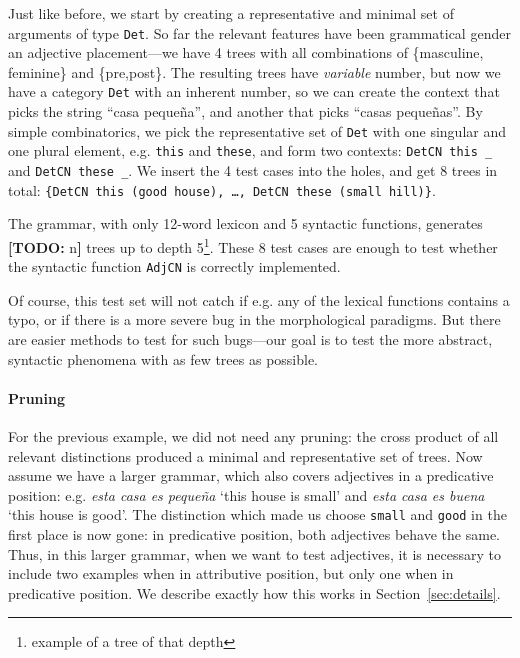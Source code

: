 \documentclass[11pt]{article}
\def\t#1{\texttt{#1}}
\newcommand{\todo}[1]{{\color{cyan}\textbf{[TODO: }#1\textbf{]}}}
\begin{document}
Just like before, we start by creating a representative and minimal
set of arguments of type \t{Det}. So far the relevant features have
been grammatical gender an adjective placement---we have 4 trees with
all combinations of \{masculine, feminine\} and \{pre,post\}. The
resulting trees have \emph{variable} number, but now we have a
category \t{Det} with an inherent number, so we can create the context
that picks the string ``casa  peque\~{n}a'', and another that picks
``casas  peque\~{n}as''. By simple combinatorics, we pick the
representative set of \t{Det} with one singular and one plural
element, e.g. \t{this} and \t{these}, and form two contexts:
\verb|DetCN this _| and  \verb|DetCN these _|. We insert the 4 test
cases into the holes, and get 8 trees in total: \t{\{DetCN this (good
  house), \dots, DetCN these (small hill)\}}. 


The grammar, with only 12-word lexicon and 5 syntactic functions,
generates \todo{n} trees up to depth 5\footnote{example of a tree of that depth}. 
These 8 test cases are enough to test whether the
syntactic function \t{AdjCN} is correctly implemented.   

Of course, this test set will not catch if e.g. any of the lexical
functions contains a typo, or if there is a more severe bug in the
morphological paradigms. But there are easier methods to test for such
bugs---our goal is to test the more abstract, syntactic phenomena with
as few trees as possible. 


\paragraph{Pruning}

For the previous example, we did not need any pruning: the cross
product of all relevant distinctions produced a minimal and
representative set of trees. Now assume we have a larger grammar,
which also covers adjectives in a predicative position:
e.g. \emph{esta casa es peque\~{n}a} `this house is small' and
\emph{esta casa es buena} `this house is good'. The distinction which
made us choose \t{small} and \t{good} in the first place is now gone:
in predicative position, both adjectives behave the same. Thus, in
this larger grammar, when we want to test adjectives, it is necessary
to include two examples when in attributive position, but only one
when in predicative position. We describe exactly how this works in
Section~\ref{sec:details}. 
\end{document}
